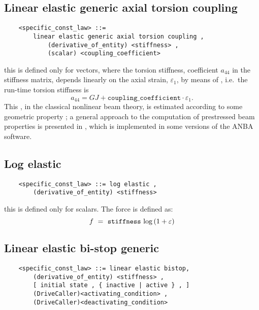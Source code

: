 \subsection{Linear elastic generic axial torsion coupling}
\label{sec:CONSTITUTIVE-LAWS:LINEAR-ELASTIC-GENERIC-AXIAL-TORSION-COUPLING}
\begin{verbatim}
    <specific_const_law> ::= 
        linear elastic generic axial torsion coupling ,  
            (derivative_of_entity) <stiffness> ,
            (scalar) <coupling_coefficient>
\end{verbatim}
this is defined only for  vectors, where the torsion stiffness,
coefficient $ a_{44} $ in the stiffness matrix, depends linearly on 
the axial strain, $ \varepsilon_1 $, by means of 
, i.e.\ the run-time torsion stiffness is 
\begin{displaymath}
	a_{44} = GJ + \mathtt{coupling\_coefficient} \cdot \varepsilon_1 .
\end{displaymath}
This , in the classical nonlinear beam theory,
is estimated according to some geometric property \cite{HOUBOLT-BROOKS-1957};
a general approach to the computation of prestressed beam properties
is presented in \cite{BORRI-MERLINI}, which is implemented in some versions
of the ANBA software.

\subsection{Log elastic}
\begin{verbatim}
    <specific_const_law> ::= log elastic ,
        (derivative_of_entity) <stiffness>      
\end{verbatim}
this is defined only for scalars. The force is defined as:
\begin{displaymath}
    f \ = \ \kw{stiffness} \ \llk{log}\plbr{1+\varepsilon}
\end{displaymath}
  
\subsection{Linear elastic bi-stop generic}
\begin{verbatim}
    <specific_const_law> ::= linear elastic bistop,
        (derivative_of_entity) <stiffness> ,
        [ initial state , { inactive | active } , ]
        (DriveCaller)<activating_condition> ,
        (DriveCaller)<deactivating_condition>
\end{verbatim}
  
